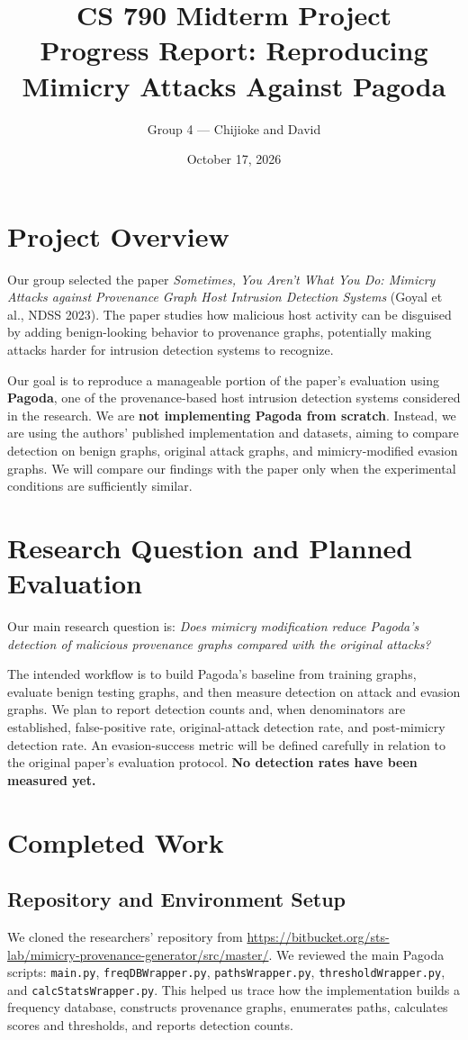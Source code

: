 \documentclass[11pt,letterpaper]{article}
\title{CS 790 Midterm Project\\\large Progress Report: Reproducing Mimicry Attacks Against Pagoda}
\author{Group 4 --- Chijioke and David}
\date{October 17, 2026}
\begin{document}
\maketitle

\section{Project Overview}
Our group selected the paper \emph{Sometimes, You Aren't What You Do: Mimicry Attacks against Provenance Graph Host Intrusion Detection Systems} (Goyal et al., NDSS 2023). The paper studies how malicious host activity can be disguised by adding benign-looking behavior to provenance graphs, potentially making attacks harder for intrusion detection systems to recognize.

Our goal is to reproduce a manageable portion of the paper's evaluation using \textbf{Pagoda}, one of the provenance-based host intrusion detection systems considered in the research. We are \textbf{not implementing Pagoda from scratch}. Instead, we are using the authors' published implementation and datasets, aiming to compare detection on benign graphs, original attack graphs, and mimicry-modified evasion graphs. We will compare our findings with the paper only when the experimental conditions are sufficiently similar.

\section{Research Question and Planned Evaluation}
Our main research question is: \emph{Does mimicry modification reduce Pagoda's detection of malicious provenance graphs compared with the original attacks?}

The intended workflow is to build Pagoda's baseline from training graphs, evaluate benign testing graphs, and then measure detection on attack and evasion graphs. We plan to report detection counts and, when denominators are established, false-positive rate, original-attack detection rate, and post-mimicry detection rate. An evasion-success metric will be defined carefully in relation to the original paper's evaluation protocol. \textbf{No detection rates have been measured yet.}

\section{Completed Work}
\subsection{Repository and Environment Setup}
We cloned the researchers' repository from \url{https://bitbucket.org/sts-lab/mimicry-provenance-generator/src/master/}. We reviewed the main Pagoda scripts: \texttt{main.py}, \texttt{freqDBWrapper.py}, \texttt{pathsWrapper.py}, \texttt{thresholdWrapper.py}, and \texttt{calcStatsWrapper.py}. This helped us trace how the implementation builds a frequency database, constructs provenance graphs, enumerates paths, calculates scores and thresholds, and reports detection counts.
\end{document}
